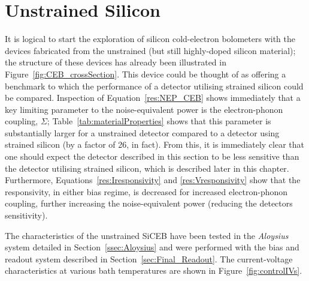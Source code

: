 \section{Unstrained Silicon}\label{sec:darkControlSi}
It is logical to start the exploration of silicon cold-electron bolometers with the devices fabricated from the unstrained (but still highly-doped silicon material); the structure of these devices has already been illustrated in Figure~\ref{fig:CEB_crossSection}. This device could be thought of as offering a benchmark to which the performance of a detector utilising strained silicon could be compared. Inspection of Equation~\ref{res:NEP_CEB} shows immediately that a key limiting parameter to the noise-equivalent power is the electron-phonon coupling, $\varSigma$; Table~\ref{tab:materialProperties} shows that this parameter is substantially larger for a unstrained detector compared to a detector using strained silicon (by a factor of 26, in fact). From this, it is immediately clear that one should expect the detector described in this section to be less sensitive than the detector utilising strained silicon, which is described later in this chapter. Furthermore, Equations~\ref{res:Iresponsivity} and \ref{res:Vresponsivity} show that the responsivity, in either bias regime, is decreased for increased electron-phonon coupling, further increasing the noise-equivalent power (reducing the detectors sensitivity).
\par 
The  characteristics of the unstrained SiCEB have been tested in the \textit{Aloysius} system detailed in Section~\ref{ssec:Aloysius} and were performed with the bias and readout system described in Section~\ref{sec:Final_Readout}. The current-voltage characteristics at various bath temperatures are shown in Figure~\ref{fig:controlIVs}.
